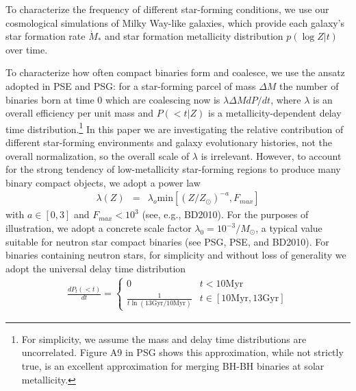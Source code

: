 \documentclass[nofootinbib,twocolumn,prd]{emulateapj}
\newcommand\unit[1]{\text{#1}}
\newcommand\abbrvPSgrb{PSG}
\newcommand\abbrvPSellipticals{PSE}
\newcommand\abbrvKBLowZa{BD2010}
\begin{document}
To characterize the frequency of different star-forming conditions, we use our cosmological simulations of Milky Way-like galaxies, which provide each galaxy's star formation rate
$\dot{M}_*$ and star formation metallicity distribution $p(\log Z|t)$ over time.

To characterize how often compact binaries form and coalesce, we use the ansatz adopted in \abbrvPSellipticals{} and
\abbrvPSgrb{}: for a star-forming parcel of mass $\Delta M$ the number of binaries born at time $0$ which
are coalescing now is $\lambda \Delta M dP/dt$, where $\lambda$ is an overall efficiency per unit mass and $P(<t|Z)$ is
a metallicity-dependent delay time distribution.\footnote{For simplicity, we assume the mass and delay time
  distributions are uncorrelated.  Figure A9 in \abbrvPSgrb{} shows this approximation, while not strictly true, is an
  excellent approximation for merging BH-BH binaries at solar metallicity.  }
    In this paper we are investigating the relative contribution of
different star-forming environments and galaxy evolutionary histories, not the overall normalization, so the overall scale of $\lambda$ is irrelevant.  
However, to account for the strong tendency of low-metallicity star-forming regions to produce many binary compact
objects, we adopt a power law
\begin{eqnarray}
\label{eq:LambdaVersusZModel}
\lambda(Z) &=& \lambda_o \text{min}[(Z/Z_\odot)^{-a}, F_{max}] 
\end{eqnarray}
with $a\in [0,3]$ and $F_{max}<10^3$
 (see, e.g.\cite{popsyn-LIGO-SFR-2008}, \abbrvKBLowZa).  For the purposes of illustration, we adopt a  concrete scale
factor  $
\lambda_0 = 10^{-3}/M_\odot $,  a typical value suitable for neutron star compact binaries (see \abbrvPSgrb{}, \abbrvPSellipticals, and \abbrvKBLowZa).
%
For binaries containing neutron stars, for simplicity and without loss of generality we adopt the universal delay time distribution
\begin{eqnarray}
\frac{dP_t(<t)}{dt} =  \begin{cases}
0 & t<10 \unit{Myr} \\
\frac{1}{t \ln (13 \unit{Gyr}/10\unit{Myr})} & t \in [10\unit{Myr},13\unit{Gyr}]
\end{cases} 
\end{eqnarray}
\end{document}
